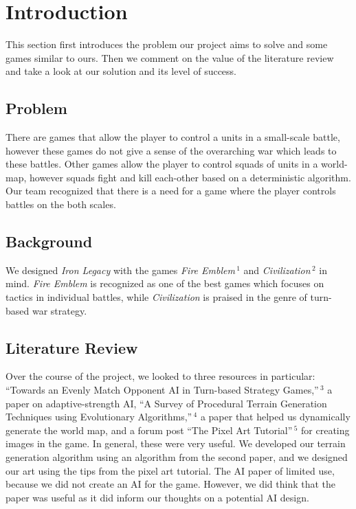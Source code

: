 \documentclass{article}
\begin{document}
\clearpage

\tableofcontents

\clearpage

\section*{Introduction}
This section first introduces the problem our project aims to solve and some
games similar to ours.
Then we comment on the value of the literature review and take a look at our
solution and its level of success.

\subsection*{Problem}
There are games that allow the player to control a units in a
small-scale battle, however these games do not give a sense of the overarching
war which leads to these battles.
Other games allow the player to control squads of units in a world-map,
however squads fight and kill each-other based on a deterministic algorithm.
Our team recognized that there is a need for a game where the player controls
battles on the both scales.

\subsection*{Background}
We designed \emph{Iron Legacy} with the games 
\emph{Fire Emblem}$\,^1$ and \emph{Civilization}$\,^2$ 
in mind.
\emph{Fire Emblem} is recognized as one of the best games which
focuses on tactics in individual battles,
while \emph{Civilization} is praised in the genre of turn-based war strategy.

\subsection*{Literature Review}
Over the course of the project, we looked to three resources in particular:
``Towards an Evenly Match Opponent AI in Turn-based Strategy Games,''$\,^3$
a paper on adaptive-strength AI, 
``A Survey of Procedural Terrain Generation Techniques using Evolutionary 
Algorithms,''$\,^4$ a paper that helped us dynamically
generate the world map, and a forum post ``The Pixel Art 
Tutorial''$\,^5$ for creating images in the game.
In general, these were very useful.
We developed our terrain generation algorithm using an algorithm from the 
second paper, and we designed our art using the tips from the pixel art
tutorial.
The AI paper of limited use, because we did not create an AI for
the game. However, we did think that the paper was useful
as it did inform our thoughts on a potential AI design.
\end{document}
